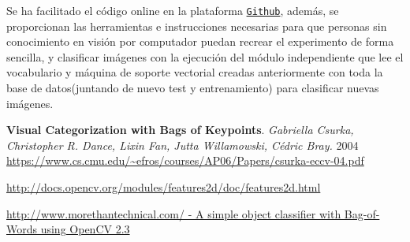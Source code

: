 \documentclass[a4paper,12pt]{article}
\begin{document}
Se ha facilitado el código online en la plataforma
\href{https://github.com/DavidGasquez/category-recognition}{\texttt{Github}},
además, se  proporcionan las herramientas e instrucciones necesarias para que 
personas sin conocimiento en visión por computador puedan recrear el experimento 
de forma sencilla, y clasificar imágenes con la ejecución del módulo 
independiente que lee el vocabulario y máquina de soporte vectorial creadas 
anteriormente con toda la base de datos(juntando de nuevo test y entrenamiento)
para clasificar nuevas imágenes.


\newpage
\begin{thebibliography}{99}

 \textbf{Visual Categorization with Bags of Keypoints}. 
 \emph{Gabriella Csurka, Christopher R. Dance, Lixin Fan, Jutta Willamowski, Cédric Bray.}
 2004 \url{https://www.cs.cmu.edu/~efros/courses/AP06/Papers/csurka-eccv-04.pdf}

 \url{http://docs.opencv.org/modules/features2d/doc/features2d.html}

 \href{http://www.morethantechnical.com/2011/08/25/a-simple-object-classifier-with-bag-of-words-using-opencv-2-3-w-code/}
{http://www.morethantechnical.com/ - A simple object classifier with Bag-of-Words using OpenCV 2.3}

\end{thebibliography}
\end{document}
